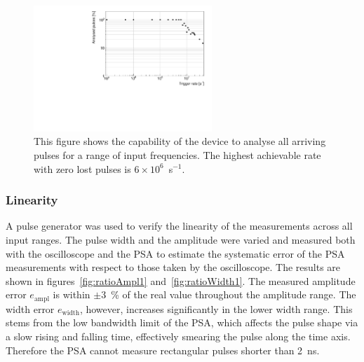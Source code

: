 \begin{figure}[!t]
\centering
\includegraphics[width=0.6\textwidth]{../scripts/05_current_monitoring/PulseGenTests/plots/freq}
\caption{This figure shows the capability of the device to analyse all arriving pulses for a range of input frequencies. The highest achievable rate with zero lost pulses is $6\times10^6$~s$^{-1}$.}
\label{fig:trigrate}
\end{figure}

\subsubsection{Linearity}
A pulse generator was used to verify the linearity of the measurements across all input ranges. The pulse width and the amplitude were varied and measured both with the oscilloscope and the PSA to estimate the systematic error of the PSA measurements with respect to those taken by the oscilloscope. The results are shown in figures~\ref{fig:ratioAmpl1} and~\ref{fig:ratioWidth1}. The measured amplitude error $e_\mathrm{ampl}$ is within $\pm$3~\% of the real value throughout the amplitude range. The width error $e_\mathrm{width}$, however, increases significantly in the lower width range. This stems from the low bandwidth limit of the PSA, which affects the pulse shape via a slow rising and falling time, effectively smearing the pulse along the time axis. Therefore the PSA cannot measure rectangular pulses shorter than 2~ns.

